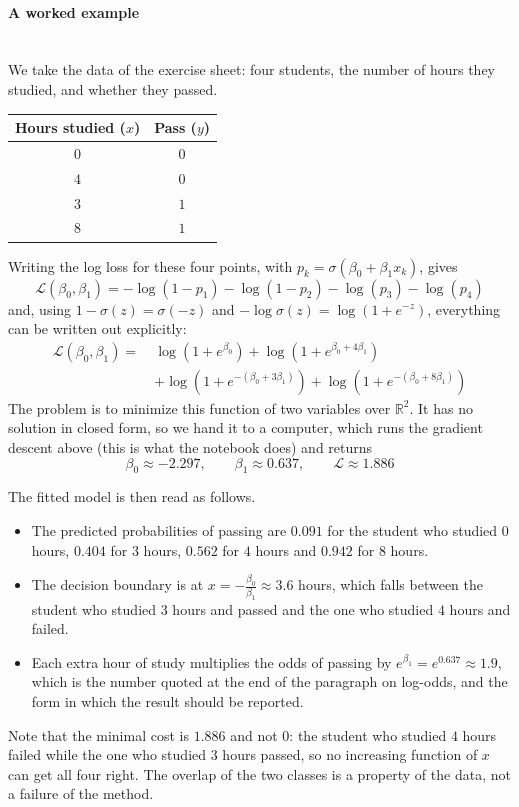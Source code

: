 \documentclass[]{article}
\newcommand{\R}{\mathbb{R}}
\begin{document}
	\paragraph{A worked example}
	\noindent\\
	We take the data of the exercise sheet: four students, the number of hours they studied, and whether they passed.

	\begin{center}
		\begin{tabular}{|c|c|}
			\hline
			Hours studied ($x$) & Pass ($y$) \\
			\hline
			$0$ & $0$ \\
			$4$ & $0$ \\
			$3$ & $1$ \\
			$8$ & $1$ \\
			\hline
		\end{tabular}
	\end{center}

	\noindent
	Writing the log loss for these four points, with $p_k = \sigma\left(\beta_0 + \beta_1 x_k\right)$, gives
	$$
	\mathcal{L}(\beta_0, \beta_1)
	= -\log\left(1 - p_1\right) - \log\left(1 - p_2\right) - \log\left(p_3\right) - \log\left(p_4\right)
	$$
	and, using $1 - \sigma(z) = \sigma(-z)$ and $-\log \sigma(z) = \log\left(1 + e^{-z}\right)$, everything can be written out explicitly:
	$$
	\begin{aligned}
		\mathcal{L}(\beta_0, \beta_1)
		= \ & \log\left(1 + e^{\beta_0}\right)
		+ \log\left(1 + e^{\beta_0 + 4\beta_1}\right) \\
		& + \log\left(1 + e^{-(\beta_0 + 3\beta_1)}\right)
		+ \log\left(1 + e^{-(\beta_0 + 8\beta_1)}\right)
	\end{aligned}
	$$
	The problem is to minimize this function of two variables over $\R^2$.
	It has no solution in closed form, so we hand it to a computer, which runs the gradient descent above (this is what the notebook does) and returns
	$$
	\beta_0 \approx -2.297,
	\qquad
	\beta_1 \approx 0.637,
	\qquad
	\mathcal{L} \approx 1.886
	$$

	\noindent
	The fitted model is then read as follows.
	\begin{itemize}
		\item The predicted probabilities of passing are $0.091$ for the student who studied $0$ hours, $0.404$ for $3$ hours, $0.562$ for $4$ hours and $0.942$ for $8$ hours.
		\item The decision boundary is at $x = -\frac{\beta_0}{\beta_1} \approx 3.6$ hours, which falls between the student who studied $3$ hours and passed and the one who studied $4$ hours and failed.
		\item Each extra hour of study multiplies the odds of passing by $e^{\beta_1} = e^{0.637} \approx 1.9$, which is the number quoted at the end of the paragraph on log-odds, and the form in which the result should be reported.
	\end{itemize}

	\noindent
	Note that the minimal cost is $1.886$ and not $0$: the student who studied $4$ hours failed while the one who studied $3$ hours passed, so no increasing function of $x$ can get all four right.
	The overlap of the two classes is a property of the data, not a failure of the method.
\end{document}
